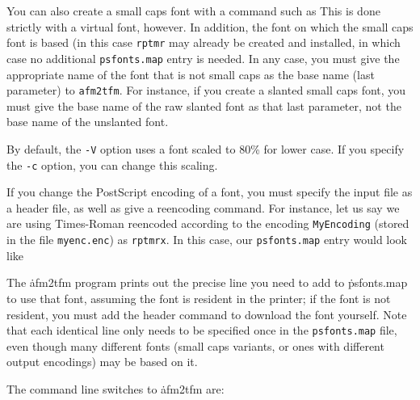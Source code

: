 You can also create a small caps font with a command such as
\noindent
This is done strictly with a virtual font, however.  In addition,
the font on which the small caps font is based (in this case
{\tt rptmr} may already be created and installed, in which case no
additional {\tt psfonts.map} entry is needed.
In any case, you must give the appropriate name of the font that
is not small caps as the base name (last parameter) to {\tt afm2tfm}.
For instance, if you create a slanted small caps font, you must
give the base name of the raw slanted font as that last parameter,
not the base name of the unslanted font.

By default, the {\tt -V} option uses a font scaled to 80\% for
lower case.  If you specify the {\tt -c} option, you can change
this scaling.

If you change the PostScript encoding of a font, you must specify the
input file as a header file, as well as give a reencoding
command.  For instance, let us say we are using Times-Roman
reencoded according to the encoding {\tt MyEncoding} (stored
in the file {\tt myenc.enc}) as {\tt rptmrx}.  In this case,
our {\tt psfonts.map} entry would look like

The \.{afm2tfm} program prints out the precise line you need to
add to \.{psfonts.map} to use that font, assuming the font is
resident in the printer; if the font is not resident, you must
add the header command to download the font yourself.  Note that
each identical line only needs to be specified once in the
{\tt psfonts.map} file, even though many different fonts (small
caps variants, or ones with different output encodings) may be
based on it.

The command line switches to \.{afm2tfm} are:

